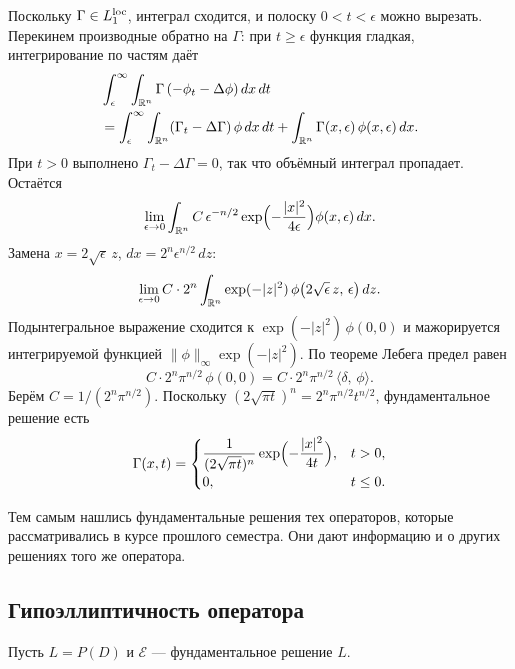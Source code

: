 \documentclass[12pt,a4paper]{article}
\begin{document}
Поскольку \(\Gamma\in L_1^{\mathrm{loc}}\), интеграл сходится,
и полоску \(0<t<\epsilon\) можно вырезать.
Перекинем производные обратно на \(\Gamma\):
при \(t\ge\epsilon\) функция гладкая, интегрирование по частям даёт
\begin{align*}
&\int_\epsilon^\infty\int_{\mathbb{R}^n}
    \Gamma\,(-\phi_t-\Delta\phi)\,dx\,dt \\
&=
\int_\epsilon^\infty\int_{\mathbb{R}^n}
    (\Gamma_t-\Delta\Gamma)\,\phi\,dx\,dt
+
\int_{\mathbb{R}^n}\Gamma(x,\epsilon)\,\phi(x,\epsilon)\,dx.
\end{align*}
При \(t>0\) выполнено \(\Gamma_t-\Delta\Gamma=0\),
так что объёмный интеграл пропадает. Остаётся
\[
\lim_{\epsilon\to 0}
\int_{\mathbb{R}^n}
    C\,\epsilon^{-n/2}
    \exp\Bigl(-\frac{|x|^2}{4\epsilon}\Bigr)
    \phi(x,\epsilon)\,dx.
\]
Замена \(x=2\sqrt{\epsilon}\,z\), \(dx=2^n\epsilon^{n/2}\,dz\):
\[
\lim_{\epsilon\to 0}
C\cdot 2^n
\int_{\mathbb{R}^n}
    \exp(-|z|^2)\,
    \phi\bigl(2\sqrt{\epsilon}\,z,\,\epsilon\bigr)\,dz.
\]
Подынтегральное выражение сходится к
\(\exp(-|z|^2)\,\phi(0,0)\)
и мажорируется интегрируемой функцией
\(\|\phi\|_\infty\exp(-|z|^2)\).
По теореме Лебега предел равен
\[
C\cdot 2^n\pi^{n/2}\,\phi(0,0)
=
C\cdot 2^n\pi^{n/2}\,
\langle\delta,\,\phi\rangle.
\]
Берём \(C=1/(2^n\pi^{n/2})\).
Поскольку \((2\sqrt{\pi t})^n=2^n\pi^{n/2}t^{n/2}\),
фундаментальное решение есть
\[
\Gamma(x,t)
=
\begin{cases}
\dfrac{1}{(2\sqrt{\pi t})^n}
\exp\Bigl(-\dfrac{|x|^2}{4t}\Bigr),
& t>0, \\[6pt]
0, & t\le 0.
\end{cases}
\]

Тем самым нашлись фундаментальные решения тех операторов,
которые рассматривались в курсе прошлого семестра.
Они дают информацию и о других решениях того же оператора.

\subsection{Гипоэллиптичность оператора}

Пусть \(L=P(D)\) и \(\mathcal{E}\) --- фундаментальное решение \(L\).


\end{document}
